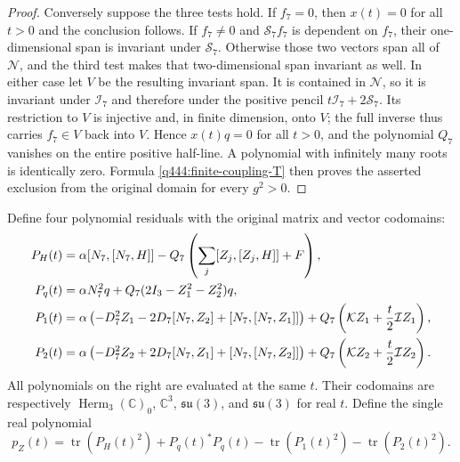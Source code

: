 \begin{proof}
Conversely suppose the three tests hold. If $f_7=0$, then $x(t)=0$ for
all $t>0$ and the conclusion follows. If $f_7\ne0$ and
$\mathcal S_7f_7$ is dependent on $f_7$, their one-dimensional span is
invariant under $\mathcal S_7$. Otherwise those two vectors span all of
$\mathcal N$, and the third test makes that two-dimensional span
invariant as well. In either case let $V$ be the resulting invariant
span. It is contained in $\mathcal N$, so it is invariant under
$\mathcal I_7$ and therefore under the positive pencil
$t\mathcal I_7+2\mathcal S_7$.
Its restriction to $V$ is injective and, in finite dimension, onto $V$;
the full inverse thus carries $f_7\in V$ back into $V$. Hence
$x(t)q=0$ for all $t>0$, and the polynomial $Q_7$ vanishes on the
entire positive half-line. A polynomial with infinitely many roots is
identically zero. Formula \eqref{q444:finite-coupling-T} then proves
the asserted exclusion from the original domain for every $g^2>0$.
\end{proof}

Define four polynomial residuals with the original
matrix and vector codomains:
\begin{align}
 P_H(t)&=\alpha[N_7,[N_7,H]]
     -Q_7\left(\sum_j[Z_j,[Z_j,H]]+F\right),\notag\\
 P_q(t)&=\alpha N_7^2q+Q_7(2I_3-Z_1^2-Z_2^2)q,\notag\\
 P_1(t)&=\alpha\left(-D_7^2Z_1-2D_7[N_7,Z_2]
                       +[N_7,[N_7,Z_1]]\right)
                  +Q_7\left(\mathcal KZ_1+\frac t2\mathcal IZ_1\right),\notag\\
 P_2(t)&=\alpha\left(-D_7^2Z_2+2D_7[N_7,Z_1]
                       +[N_7,[N_7,Z_2]]\right)
                  +Q_7\left(\mathcal KZ_2+\frac t2\mathcal IZ_2\right).
 \label{q444:finite-coupling-polynomial-residuals}
\end{align}
All polynomials on the right are evaluated at the same $t$.
Their codomains are respectively
$\operatorname{Herm}_3(\mathbb C)_0$, $\mathbb C^3$,
$\mathfrak{su}(3)$, and $\mathfrak{su}(3)$ for real $t$.
Define the single real polynomial
\begin{equation}
 p_Z(t)=\operatorname{tr}(P_H(t)^2)+P_q(t)^*P_q(t)
                  -\operatorname{tr}(P_1(t)^2)-\operatorname{tr}(P_2(t)^2).
 \label{q444:finite-coupling-one-polynomial}
\end{equation}

